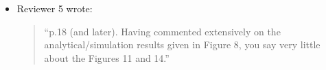 \documentclass{article}
\begin{document}
\begin{itemize}
\item Reviewer 5 wrote:
\begin{quote}
``p.18 (and later). Having commented extensively on the analytical/simulation results given in Figure 8, you say very little about the Figures 11 and 14.''
\end{quote}


\end{itemize}
\end{document}

